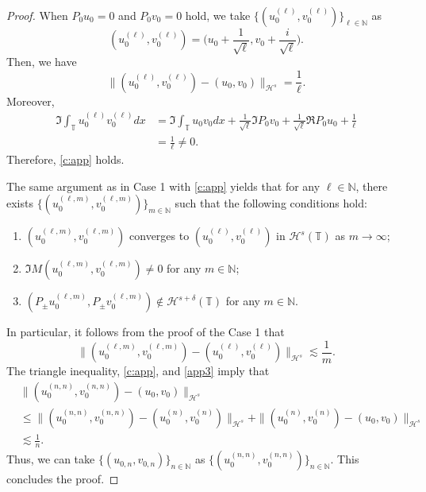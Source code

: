 \documentclass[10pt,a4paper]{amsart}
\renewcommand{\H}{\mathcal H}
\newcommand{\N}{\mathbb{N}}
\newcommand{\T}{\mathbb{T}}
\newcommand{\dl}{\delta}
\renewcommand{\l}{\ell}
\newcommand{\les}{\lesssim}
\begin{document}
\begin{proof}
When $P_0 u_0 = 0$ and $P_0 v_0 = 0$ hold,
we take $\{(u_0^{(\l)}, v_0^{(\l)})\}_{\l \in \N}$ as
\[
(u_0^{(\l)}, v_0^{(\l)}) = \Big( u_0 + \frac 1{\sqrt \l}, v_0 + \frac i {\sqrt \l} \Big).
\]
Then, we have 
\[
\| (u_0^{(\l)}, v_0^{(\l)}) - (u_0, v_0) \|_{\H^s} = \frac 1\l.
\]
Moreover, 
\[
\begin{aligned}
\Im \int_\T  u_0^{(\l)} v_0^{(\l)} dx 
&=
\Im \int_\T u_0 v_0 dx + \frac 1{\sqrt \l}\Im P_0 v_0 + \frac 1{\sqrt \l} \Re P_0 u_0 
+ \frac 1{\l}  
\\
&= \frac 1{\l} \neq 0.
\end{aligned}
\]
Therefore, \eqref{c:app} holds.

The same argument as in Case 1 with \eqref{c:app} yields that
for any $\l \in \N$,
there exists $\{(u_0^{(\l, m)}, v_0^{(\l, m)}) \}_{m \in \N}$ such that
the following conditions hold:
\begin{enumerate}
\item $(u_0^{(\l, m)}, v_0^{(\l, m)})$ converges to $(u_0^{(\l)}, v_0^{(\l)})$ 
in $\H^s(\T)$ as $m \to \infty$;
\item $\Im M (u_0^{(\l, m)}, v_0^{(\l, m)}) \neq 0$ for any $m \in \N$;
\item $(P_\pm u_0^{(\l, m)}, P_\pm v_0^{(\l, m)}) \notin \H^{s+\dl}(\T)$ for any $m \in \N$.
\end{enumerate}
In particular,
it follows from the proof of the Case 1 that
\begin{equation}
\| (u_0^{(\l, m)}, v_0^{(\l, m)}) - (u_0^{(\l)}, v_0^{(\l)}) \|_{\H^s}
\les
\frac 1m.
\label{app3}
\end{equation}
The triangle inequality, \eqref{c:app}, and \eqref{app3} imply that
\[
\begin{aligned}
&\| (u_0^{(n,n)}, v_0^{(n,n)}) - (u_0, v_0) \|_{\H^s}
\\
&\le
\| (u_0^{(n, n)}, v_0^{(n, n)}) - (u_0^{(n)}, v_0^{(n)}) \|_{\H^s}
+ \| (u_0^{(n)}, v_0^{(n)}) - (u_0, v_0) \|_{\H^s}
\\
&\les \frac 1n.
\end{aligned}
\]
Thus, we can take $\{ (u_{0, n}, v_{0, n}) \}_{n \in \N}$ as 
$ \{ (u_0^{(n,n)}, v_0^{(n,n)}) \}_{n \in \N}$.
This concludes the proof.
\end{proof}
\end{document}
